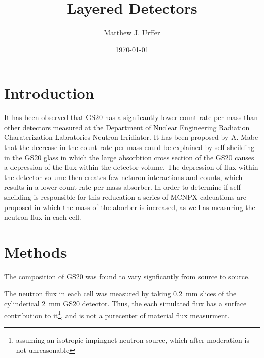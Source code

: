 \documentclass[draftcls,onecolumn]{IEEEtran}
\begin{document}
\title{Layered Detectors}
\author{Matthew J. Urffer}
\date{\today}
\maketitle


\listoftodos
\tableofcontents
\listoffigures
\listoftables
\lstlistoflistings

\section{Introduction}
It has been observed that GS20 has a signficantly lower count rate per mass  than other detectors measured at the Department of Nuclear Engineering Radiation Charaterization Labratories Neutron Irridiator.
It has been proposed by A. Mabe that the decrease in the count rate per mass  could be explained by self-sheilding in the GS20 glass in which the large absorbtion cross section of the GS20 causes a depression of the flux within the detector volume.
The depression of flux within the detector volume then creates few neturon interactions and counts, which results in a lower count rate per mass absorber.
In order to determine if self-sheilding is responsible for this reducation a series of MCNPX calcuations are proposed in which the mass of the aborber is increased, as well as measuring the neutron flux in each cell.


\section{Methods}

The composition of GS20 was found to vary signficantly from source to source.

The neutron flux in each cell was measured by taking \SI{0.2}{\mm} slices of the cylinderical \SI{2}{\mm} GS20 detector.
Thus, the each simulated flux has a surface contribution to it\footnote{assuming an isotropic impingnet neutron source, which after moderation is not unreasonable}, and is not a purecenter of material flux measurment.
\end{document}
